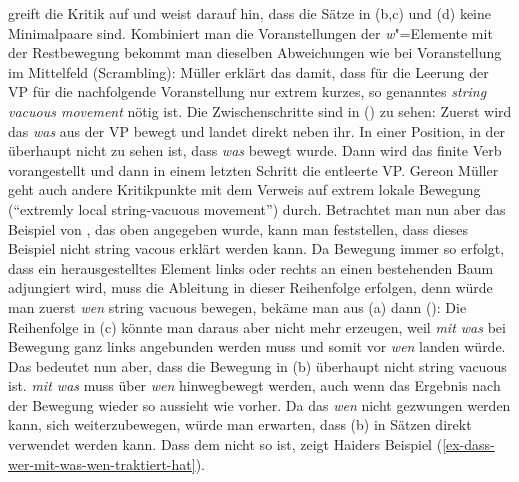 \citet{GMueller2014a-u} greift die Kritik auf und weist darauf hin, dass die Sätze in (b,c)
und (d) keine Minimalpaare sind. 
\eal
{}
\zl
Kombiniert man die Voranstellungen der \emph{w}"=Elemente mit der Restbewegung bekommt man dieselben
Abweichungen wie bei Voranstellung im Mittelfeld (Scrambling):
\eal
{}
\zl
Müller erklärt das damit, dass für die Leerung der VP für die nachfolgende Voranstellung nur extrem
kurzes, so genanntes \emph{string vacuous movement} nötig ist. Die Zwischenschritte sind in
() zu sehen:
\eal
{}
\zl
Zuerst wird das \emph{was} aus der VP bewegt und landet direkt neben ihr. In einer Position, in der
überhaupt nicht zu sehen ist, dass \emph{was} bewegt wurde. Dann wird das finite Verb vorangestellt
und dann in einem letzten Schritt die entleerte VP. Gereon Müller geht auch andere Kritikpunkte mit
dem Verweis auf extrem lokale Bewegung (``extremly local string-vacuous movement'')
durch. Betrachtet man nun aber das Beispiel von \citet[281]{Haider93a}, das oben angegeben wurde,
kann man feststellen, dass dieses Beispiel nicht string vacous erklärt werden kann.
\eal
{}
\zl
Da Bewegung immer so erfolgt, dass ein herausgestelltes Element links oder rechts an einen
bestehenden Baum adjungiert wird, muss die Ableitung in dieser Reihenfolge erfolgen, denn würde man
zuerst \emph{wen} string vacuous bewegen, bekäme man aus (a) dann ():
\z
Die Reihenfolge in (c) könnte man daraus aber nicht mehr erzeugen, weil \emph{mit was} bei Bewegung ganz links
angebunden werden muss und somit vor \emph{wen} landen würde. Das bedeutet nun aber, dass die
Bewegung in (b) überhaupt nicht string vacuous ist. \emph{mit was} muss über \emph{wen}
hinwegbewegt werden, auch wenn das Ergebnis nach der Bewegung wieder so aussieht wie vorher. Da das
\emph{wen} nicht gezwungen werden kann, sich weiterzubewegen, würde man erwarten, dass (b)
in Sätzen direkt verwendet werden kann. Dass dem nicht so ist, zeigt Haiders Beispiel (\ref{ex-dass-wer-mit-was-wen-traktiert-hat}).



